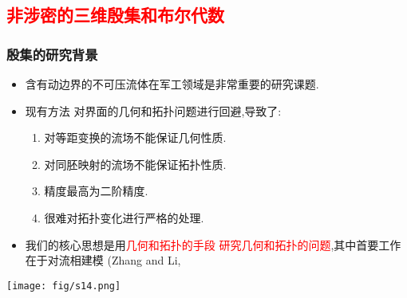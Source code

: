 \documentclass[UTF8]{ctexbeamer}	%
\theoremstyle{plain}
\theoremstyle{definition}
\theoremstyle{remark}
\numberwithin{equation}{section}
\begin{document}
\subsection{\textcolor{red}{非涉密的三维殷集和布尔代数}}
\begin{frame}
    \frametitle{殷集的研究背景}
    \begin{itemize}
        \item 含有动边界的不可压流体在军工领域是非常重要的研究课题.
        \item 现有方法
              对界面的几何和拓扑问题进行回避,导致了:
              \begin{enumerate}
                  \item 对等距变换的流场不能保证几何性质.
                  \item 对同胚映射的流场不能保证拓扑性质.
                  \item 精度最高为二阶精度.
                  \item 很难对拓扑变化进行严格的处理.
              \end{enumerate}
        \item 我们的核心思想是用\textcolor{red}{几何和拓扑的手段
                  研究几何和拓扑的问题},其中首要工作在于对流相建模
              (Zhang and Li, 





    \end{itemize}
    \begin{center}
        \texttt{[image: fig/s14.png]}
    \end{center}
\end{frame}
\end{document}
